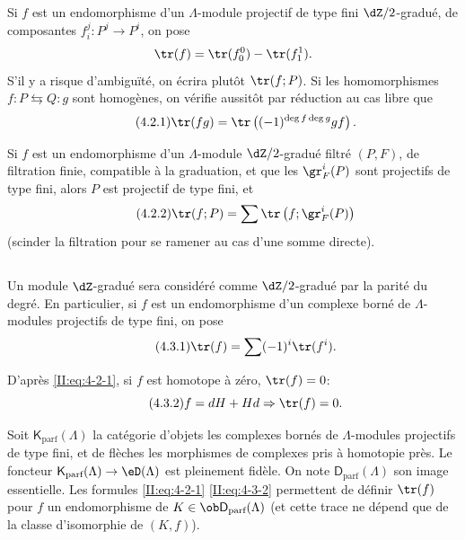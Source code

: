 Si $f$ est un endomorphisme d'un $\Lambda$-module projectif de type fini 
$\dZ/2$-gradué, de composantes $f_i^j:P^j\to P^i$, on pose 
\[
  \tr(f) = \tr(f_0^0) - \tr(f_1^1) \text{.}
\]
S'il y a risque d'ambiguïté, on écrira plutôt $\tr(f;P)$. Si les 
homomorphismes $f:P\leftrightarrows Q:g$ sont homogènes, on vérifie 
aussitôt par réduction au cas libre que 
\begin{equation*}\tag{4.2.1}\label{II:eq:4-2-1}
  \tr(f g) = \tr\left((-1)^{\deg f \deg g} g f\right) \text{.}
\end{equation*}

Si $f$ est un endomorphisme d'un $\Lambda$-module $\dZ/2$-gradué filtré 
$(P,F)$, de filtration finie, compatible à la graduation, et que les 
$\gr_F^i(P)$ sont projectifs de type fini, alors $P$ est projectif de type 
fini, et 
\begin{equation*}\tag{4.2.2}\label{II:eq:4-2-2}
  \tr(f;P) = \sum \tr\left(f; \gr_F^i(P) \right)
\end{equation*}
(scinder la filtration pour se ramener au cas d'une somme directe). 





\subsection{}\label{II:4-3}

Un module $\dZ$-gradué sera considéré comme $\dZ/2$-gradué par la 
parité du degré. En particulier, si $f$ est un endomorphisme d'un complexe 
borné de $\Lambda$-modules projectifs de type fini, on pose 
\begin{equation*}\tag{4.3.1}\label{II:eq:4-3-1}
  \tr(f) = \sum (-1)^i \tr(f^i) \text{.}
\end{equation*}

D'après \eqref{II:eq:4-2-1}, si $f$ est homotope à zéro, $\tr(f) = 0$: 
\begin{equation*}\tag{4.3.2}\label{II:eq:4-3-2}
  f = d H + H d \Rightarrow \tr(f) = 0 \text{.}
\end{equation*}

Soit $\mathsf{K}_\text{parf}(\Lambda)$ la catégorie d'objets les complexes 
bornés de $\Lambda$-modules projectifs de type fini, et de flèches les 
morphismes de complexes pris à homotopie près. Le foncteur 
$\mathsf{K}_\text{parf}(\Lambda)\to\eD(\Lambda)$ est pleinement fidèle. On note 
$\mathsf{D}_\text{parf}(\Lambda)$ son image essentielle. Les formules 
\eqref{II:eq:4-2-1} \eqref{II:eq:4-3-2} permettent de définir $\tr(f)$ pour $f$ 
un endomorphisme de $K\in\ob \mathsf{D}_\text{parf}(\Lambda)$ (et cette trace ne 
dépend que de la classe d'isomorphie de $(K,f)$). 





